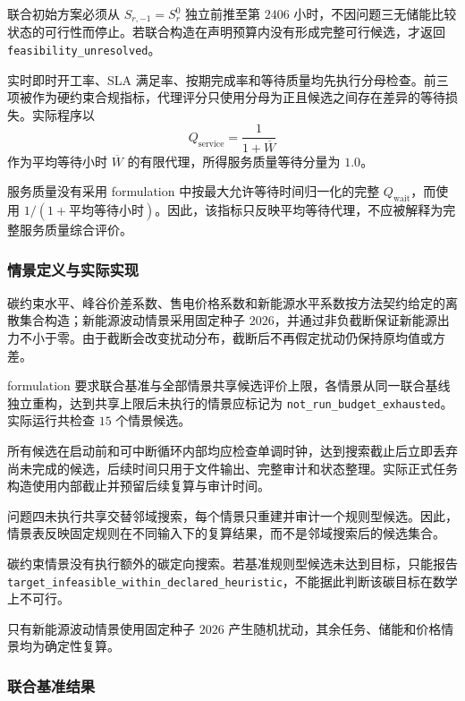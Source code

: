 联合初始方案必须从 $S_{r,-1}=S_r^0$ 独立前推至第 $2406$ 小时，不因问题三无储能比较状态的可行性而停止。若联合构造在声明预算内没有形成完整可行候选，才返回 \texttt{feasibility\_unresolved}。

实时即时开工率、SLA 满足率、按期完成率和等待质量均先执行分母检查。前三项被作为硬约束合规指标，代理评分只使用分母为正且候选之间存在差异的等待损失。实际程序以
\begin{equation}
Q_{\mathrm{service}}=\frac{1}{1+\overline W}
\end{equation}
作为平均等待小时 $\overline W$ 的有限代理，所得服务质量等待分量为 $1.0$。

服务质量没有采用 formulation 中按最大允许等待时间归一化的完整 $Q_{\mathrm{wait}}$，而使用 $1/(1+\text{平均等待小时})$。因此，该指标只反映平均等待代理，不应被解释为完整服务质量综合评价。

\subsubsection{情景定义与实际实现}

碳约束水平、峰谷价差系数、售电价格系数和新能源水平系数按方法契约给定的离散集合构造；新能源波动情景采用固定种子 $2026$，并通过非负截断保证新能源出力不小于零。由于截断会改变扰动分布，截断后不再假定扰动仍保持原均值或方差。

formulation 要求联合基准与全部情景共享候选评价上限，各情景从同一联合基线独立重构，达到共享上限后未执行的情景应标记为 \texttt{not\_run\_budget\_exhausted}。实际运行共检查 $15$ 个情景候选。

所有候选在启动前和可中断循环内部均应检查单调时钟，达到搜索截止后立即丢弃尚未完成的候选，后续时间只用于文件输出、完整审计和状态整理。实际正式任务构造使用内部截止并预留后续复算与审计时间。

问题四未执行共享交替邻域搜索，每个情景只重建并审计一个规则型候选。因此，情景表反映固定规则在不同输入下的复算结果，而不是邻域搜索后的候选集合。

碳约束情景没有执行额外的碳定向搜索。若基准规则型候选未达到目标，只能报告 \texttt{target\_infeasible\_within\_declared\_heuristic}，不能据此判断该碳目标在数学上不可行。

只有新能源波动情景使用固定种子 $2026$ 产生随机扰动，其余任务、储能和价格情景均为确定性复算。

\subsubsection{联合基准结果}

